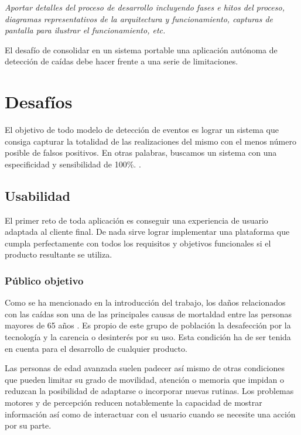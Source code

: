 \textit{Aportar detalles del proceso de desarrollo incluyendo fases e hitos del proceso, diagramas representativos de la arquitectura y funcionamiento, capturas de pantalla para ilustrar el funcionamiento, etc.}

El desafío de consolidar en un sistema portable una aplicación autónoma de detección de caídas debe hacer frente a una serie de limitaciones.

\section{Desafíos}

 El objetivo de todo modelo de detección de eventos es lograr un sistema que consiga capturar la totalidad de las realizaciones del mismo con el menos número posible de falsos positivos. En otras palabras, buscamos un sistema con una especificidad y sensibilidad de 100\%\cite{Noury2007}. .

\subsection{Usabilidad}
El primer reto de toda aplicación es conseguir una experiencia de usuario adaptada al cliente final. De nada sirve lograr implementar una plataforma que cumpla perfectamente con todos los requisitos y objetivos funcionales si el producto resultante se utiliza.

\subsubsection{Público objetivo}
Como se ha mencionado en la introducción del trabajo, los daños relacionados con las caídas son una de las principales causas de mortaldad entre las personas mayores de 65 años . Es propio de este grupo de población la desafección por la tecnología y la carencia o desinterés por su uso. Esta condición ha de ser tenida en cuenta para el desarrollo de cualquier producto.

Las personas de edad avanzada suelen padecer así mismo de otras condiciones que pueden limitar su grado de movilidad, atención o memoria que impidan o reduzcan la posibilidad de adaptarse o incorporar nuevas rutinas. Los problemas motores y de percepción reducen notablemente la capacidad de mostrar información así como de interactuar con el usuario cuando se necesite una acción por su parte.


